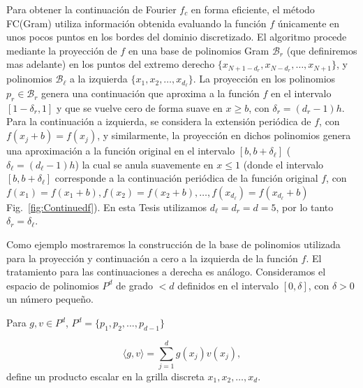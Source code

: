 Para obtener la continuación de Fourier $f_c$ en forma eficiente, el método FC(Gram) utiliza información obtenida 
evaluando la función $f$ únicamente en unos pocos puntos 
en los bordes del dominio discretizado. 
El algoritmo procede mediante la proyección de $f$ en una base de polinomios Gram $\mathcal{B}_r$ 
(que definiremos mas adelante) en los puntos del extremo 
derecho $\{x_{N+1-d_r},x_{N-d_r},\ldots, x_{N+1} \}$, y 
polinomios $\mathcal{B}_{\ell}$ a la izquierda $\{x_{1},x_{2},\ldots, x_{d_{\ell}} \}$. 
La proyección en los polinomios $p_r \in \mathcal{B}_r$ genera una continuación que 
aproxima a la función $f$ en el intervalo $[1-\delta_r,1]$ y que se vuelve cero de 
forma suave en $x\ge b$, con $\delta_r=(d_r-1)h$. Para la continuación a izquierda, se considera 
la extensión periódica de $f$, con $f(x_j+b)=f(x_j)$, y similarmente, la proyección 
en dichos polinomios genera una aproximación a la función original en el intervalo $[b,b+\delta_{\ell}]$ ($\delta_{\ell}=(d_{\ell}-1)h$) la cual se anula suavemente en $x\leq 1$ (donde el 
intervalo $[b,b+\delta_{\ell}]$ corresponde a la continuación periódica de la función original $f$, con $f(x_1)=f(x_1+b),f(x_2)=f(x_2+b),\ldots, f(x_{d_{\ell}})=f(x_{d_{\ell}}+b)$ Fig.~\ref{fig:Continuedf}). 
En esta Tesis utilizamos $d_{\ell}=d_r=d=5$, por lo tanto $\delta_r=\delta_{\ell}$.  

Como ejemplo mostraremos la construcción de la base 
de polinomios utilizada para la proyección y continuación a cero 
a la izquierda de la función $f$. El tratamiento para las continuaciones a derecha 
es análogo.
Consideramos el espacio de polinomios $P^d$ de grado $<d$ definidos en el intervalo $[0,\delta]$, con $\delta>0$ un número pequeño.

Para $g,v\in P^d$, $P^d=\{p_1,p_2,...,p_{d-1}\}$

\begin{equation}
\langle g,v\rangle =\sum_{j=1}^{d}g(x_j)v(x_j),
\label{eq:dotpd}
\end{equation}
define un producto escalar en la grilla discreta $x_1,x_2,\ldots,x_d$.

